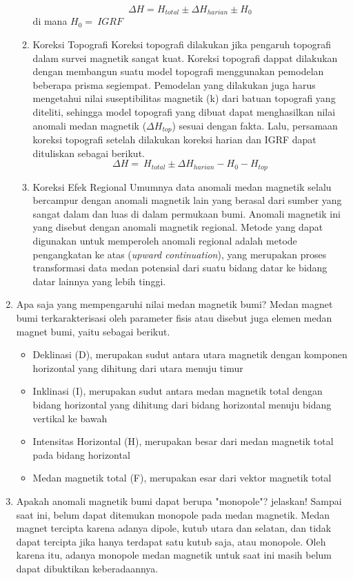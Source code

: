 \documentclass{article}
\begin{document}
\begin{enumerate}
\begin{enumerate}[label=\alph*.]
        \[\Delta H = H_{total} \pm \Delta H_{harian} \pm H_{0}\]
        di mana \(H_{0} = \ IGRF\)
        \item Koreksi Topografi
        \subitem Koreksi topografi dilakukan jika pengaruh topografi dalam survei magnetik sangat kuat. Koreksi topografi dappat dilakukan dengan membangun suatu model topografi menggunakan pemodelan beberapa prisma segiempat. Pemodelan yang dilakukan juga harus mengetahui nilai suseptibilitas magnetik (k) dari batuan topografi yang diteliti, sehingga model topografi yang dibuat dapat menghasilkan nilai anomali medan magnetik (\(\Delta H_{top}\)) sesuai dengan fakta. Lalu, persamaan koreksi topografi setelah dilakukan koreksi harian dan IGRF dapat dituliskan sebagai berikut.
        \[\Delta H = \ H_{total} \pm \Delta H_{harian} - H_0 - H_{top}\]
        \item Koreksi Efek Regional
        \subitem Umumnya data anomali medan magnetik selalu bercampur dengan anomali magnetik lain yang berasal dari sumber yang sangat dalam dan luas di dalam permukaan bumi. Anomali magnetik ini yang disebut dengan anomali magnetik regional. Metode yang dapat digunakan untuk memperoleh anomali regional adalah metode pengangkatan ke atas (\textit{upward continuation}), yang merupakan proses transformasi data medan potensial dari suatu bidang datar ke bidang datar lainnya yang lebih tinggi.
    \end{enumerate}
    \item Apa saja yang mempengaruhi nilai medan magnetik bumi?
    \subitem Medan magnet bumi  terkarakterisasi oleh parameter fisis atau disebut juga elemen medan magnet bumi, yaitu sebagai berikut.
    \begin{itemize}
        \item Deklinasi (D), merupakan sudut antara utara magnetik dengan komponen horizontal yang dihitung dari utara menuju timur
        \item Inklinasi (I), merupakan sudut antara medan magnetik total dengan bidang horizontal yang dihitung dari bidang horizontal menuju bidang vertikal ke bawah
        \item Intensitas Horizontal (H), merupakan besar dari medan magnetik total pada bidang horizontal
        \item Medan magnetik total (F), merupakan esar dari vektor magnetik total
    \end{itemize}
    \item Apakah anomali magnetik bumi dapat berupa "monopole"? jelaskan!
    \subitem Sampai saat ini, belum dapat ditemukan monopole pada medan magnetik. Medan magnet tercipta karena adanya dipole, kutub utara dan selatan, dan tidak dapat tercipta jika hanya terdapat satu kutub saja, atau monopole. Oleh karena itu, adanya monopole medan magnetik untuk saat ini masih belum dapat dibuktikan keberadaannya.
\end{enumerate}
\end{document}
